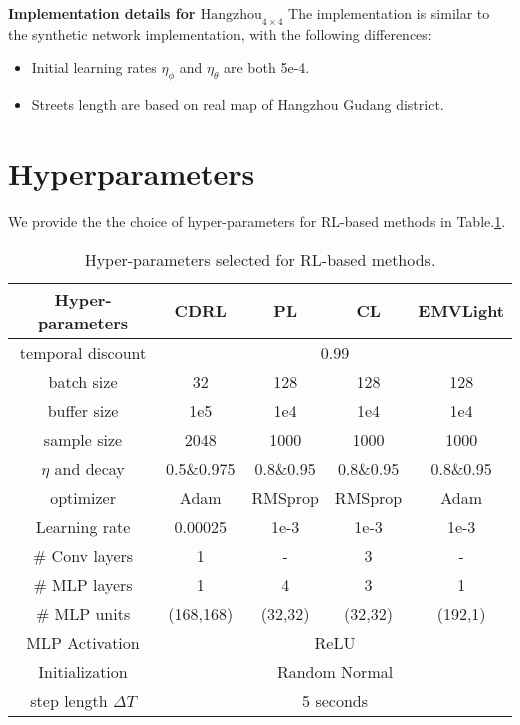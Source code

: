 \textbf{Implementation details for \texorpdfstring{$\text{Hangzhou}_{4 \times 4}$}{Manhattan}}
The implementation is similar to the synthetic network implementation, with the following differences:
\begin{itemize}
    \item Initial learning rates $\eta_\phi$ and $\eta_\theta$ are both 5e-4.
    \item Streets length are based on real map of Hangzhou Gudang district.
\end{itemize}

\section{Hyperparameters}\label{appendix_b}
We provide the the choice of hyper-parameters for RL-based methods in Table.\ref{tab_RL_hyperparameters}.
\begin{table}[ht]
\centering
\fontsize{9.0pt}{10.0pt} \selectfont
\begin{tabular}{@{}ccccc@{}}
\toprule
Hyper-parameters & CDRL   & PL   & CL   & EMVLight   \\ \midrule
temporal discount  &   \multicolumn{4}{c}{0.99} \\
batch size      &  32     &  128    & 128     &    128        \\
buffer size     & 1e5      &  1e4    &  1e4    &   1e4         \\
sample size     &  2048     & 1000     & 1000     &  1000          \\
$\eta$ and decay  & 0.5\&0.975 & 0.8\&0.95     &  0.8\&0.95    & 0.8\&0.95           \\ \midrule
optimizer       &  Adam     & RMSprop     &  RMSprop    &   Adam         \\
Learning rate   &  0.00025     &  1e-3    & 1e-3     &   1e-3         \\ \midrule
\# Conv layers   &   1    &  -     &  3    &    -        \\
\# MLP layers    &   1    &   4   &  3    &      1      \\
\# MLP units     &   (168,168)    & (32,32)     &  (32,32)    &   (192,1)         \\
MLP Activation  & \multicolumn{4}{c}{ReLU}         \\
Initialization  & \multicolumn{4}{c}{Random Normal} \\
\midrule
step length $\Delta T$      &   \multicolumn{4}{c}{ 5 seconds}      \\
\bottomrule
\end{tabular}
\caption{Hyper-parameters selected for RL-based methods.}
\label{tab_RL_hyperparameters}
\end{table}

